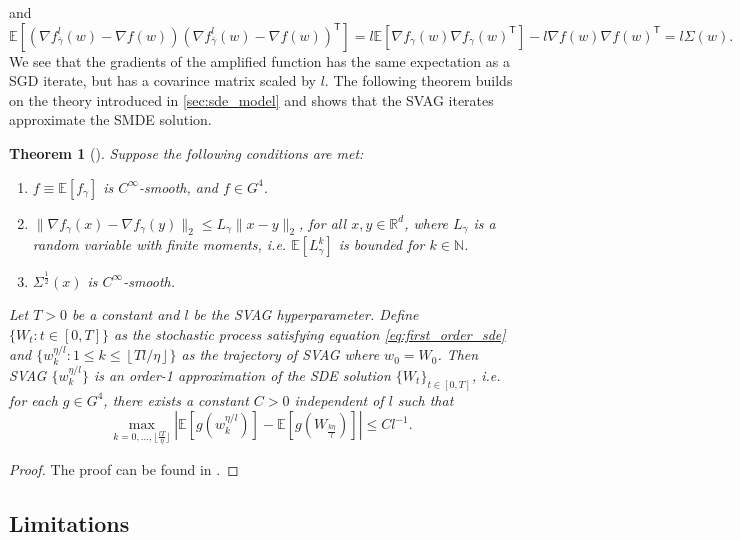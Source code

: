 \documentclass[12pt]{article}
\newtheorem{theorem}{Theorem}[section]
\theoremstyle{definition}
\numberwithin{equation}{section}
\newcommand{\N}{\mathbb{N}}
\newcommand{\R}{\mathbb{R}}
\newcommand{\T}{\mathsf{T}}
\newcommand{\ev}[1]{\mathbb{E}\left[{#1}\right]}
\newcommand{\norm}[1]{\lVert{#1}\rVert_2}
\begin{document}
and
\begin{equation*}
  \ev{\left(\nabla f^l_{\bar{\gamma}}(w) - \nabla f(w)\right)\left(\nabla f^l_{\bar{\gamma}}(w) - \nabla f(w)\right)^\T} = l\ev{\nabla f_{\gamma}(w)\nabla f_{\gamma}(w)^\T} - l \nabla f(w) \nabla f(w)^\T = l \Sigma(w).
\end{equation*}
We see that the gradients of the amplified function has the same expectation as a SGD iterate, but has a covarince matrix scaled by $l$.
The following theorem builds on the theory introduced in \autoref{sec:sde_model} and shows that the SVAG iterates approximate the SMDE solution.
\begin{theorem}[\cite{liValidityModelingSGD2021}]
  \label{thm:svag}
  Suppose the following conditions are met:
  \begin{enumerate}[label=(\roman*)]
    \item $f \equiv \ev{f_{\gamma}}$ is $C^{\infty}$-smooth, and $f \in G^4$.
    \item $\norm{\nabla f_{\gamma}(x) - \nabla f_{\gamma}(y)} \leq L_{\gamma} \norm{x - y}$, for all $x, y \in \R^d$, where $L_{\gamma}$ is a random variable with finite moments, i.e. $\ev{L_{\gamma}^k}$ is bounded for $k \in \N$.
    \item $\Sigma^{\frac{1}{2}}(x)$ is $C^{\infty}$-smooth.
  \end{enumerate}
  Let $T > 0$ be a constant and $l$ be the SVAG hyperparameter. Define $\{W_t : t \in [0,T] \}$ as the stochastic process satisfying equation \eqref{eq:first_order_sde} and $\{w_k^{\eta/l}: 1 \leq k \leq \left\lfloor Tl/\eta \right\rfloor \}$ as the trajectory of SVAG where $w_0 = W_0$. Then SVAG $\{w_k^{\eta/l}\}$ is an order-1 approximation of the SDE solution $\{W_t\}_{t \in [0,T]}$, i.e. for each $g \in G^4$, there exists a constant $C > 0$ independent of $l$ such that
  \begin{equation*}
    \max_{k=0,\dots, \lfloor \frac{lT}{\eta} \rfloor} \left\lvert \ev{g(w^{\eta/l}_k)} - \ev{g(W_{\frac{k\eta}{l}})} \right\rvert \leq C l^{-1}.
  \end{equation*}
\end{theorem}
\begin{proof}
  The proof can be found in \cite{liValidityModelingSGD2021}.
\end{proof}
\subsection{Limitations}
\end{document}
